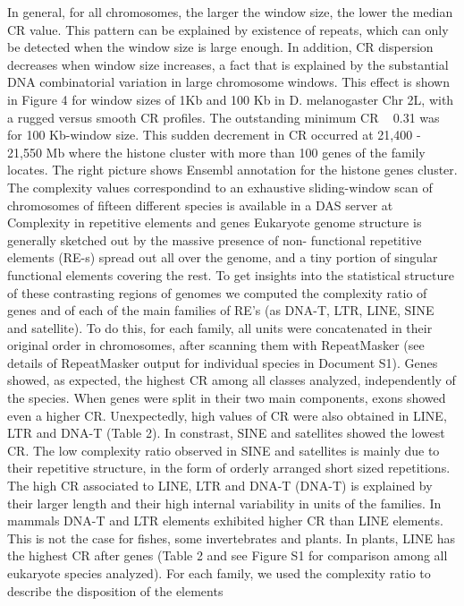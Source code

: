 In general, for all chromosomes, the larger the window size, the lower the median CR value.
This pattern can be explained by existence of repeats, which can only be detected when the
window size is large enough. In addition, CR dispersion decreases when window size
increases, a fact that is explained by the substantial DNA combinatorial variation in large
chromosome windows. This effect is shown in Figure 4 for window sizes of 1Kb and 100 Kb
in D. melanogaster Chr 2L, with a rugged versus smooth CR profiles. The outstanding
minimum CR ~ 0.31 was for 100 Kb-window size. This sudden decrement in CR occurred at
21,400 - 21,550 Mb where the histone cluster with more than 100 genes of the family locates.
The right picture shows Ensembl annotation for the histone genes cluster. The complexity
values correspondind to an exhaustive sliding-window scan of chromosomes of fifteen
different species is available in a DAS server at 
Complexity in repetitive elements and genes
Eukaryote genome structure is generally sketched out by the massive presence of non-
functional repetitive elements (RE-s) spread out all over the genome, and a tiny portion of
singular functional elements covering the rest. To get insights into the statistical structure of
these contrasting regions of genomes we computed the complexity ratio of genes and of each
of the main families of RE's (as DNA-T, LTR, LINE, SINE and satellite). To do this, for
each family, all units were concatenated in their original order in chromosomes, after
scanning them with RepeatMasker (see details of RepeatMasker output for individual species
in Document S1).
Genes showed, as expected, the highest CR among all classes analyzed, independently of the
species. When genes were split in their two main components, exons showed even a
higher CR. Unexpectedly, high values of CR were also obtained in LINE, LTR and DNA-T
(Table 2). In constrast, SINE and satellites showed the lowest CR. The low complexity ratio
observed in SINE and satellites is mainly due to their repetitive structure, in the form of
orderly arranged short sized repetitions. The high CR associated to LINE, LTR and DNA-T
(DNA-T) is explained by their larger length and their high internal variability in units of the
families. In mammals DNA-T and LTR elements exhibited higher CR than LINE elements.
This is not the case for fishes, some invertebrates and plants. In plants, LINE has the highest
CR after genes (Table 2 and see Figure S1 for comparison among all eukaryote species
analyzed).
For each family, we used the complexity ratio to describe the disposition of the elements
